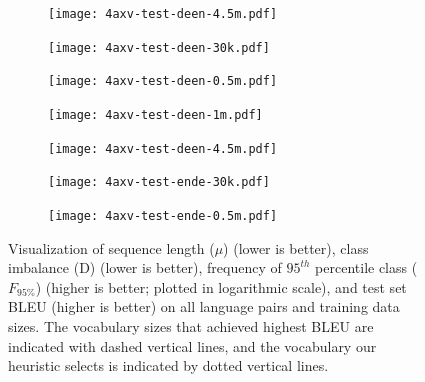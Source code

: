 \begin{figure}[h!t]
\centering
\begin{subfigure}{\textwidth}
  \centering
  \texttt{[image: 4axv-test-deen-4.5m.pdf]}
\end{subfigure}

\vspace{1mm}

\begin{subfigure}{.44\textwidth}
  \centering
  \texttt{[image: 4axv-test-deen-30k.pdf]}
\end{subfigure}
\begin{subfigure}{.44\textwidth}
  \centering
  \texttt{[image: 4axv-test-deen-0.5m.pdf]}
\end{subfigure}


\begin{subfigure}{.44\textwidth}
  \centering
  \texttt{[image: 4axv-test-deen-1m.pdf]}
\end{subfigure}
\begin{subfigure}{.44\textwidth}
  \centering
  \texttt{[image: 4axv-test-deen-4.5m.pdf]}
\end{subfigure}

\begin{subfigure}{.44\textwidth}
  \centering
  \texttt{[image: 4axv-test-ende-30k.pdf]}
\end{subfigure}
\begin{subfigure}{.44\textwidth}
  \centering
  \texttt{[image: 4axv-test-ende-0.5m.pdf]}
\end{subfigure}

\caption[Visualization of sequence length, class imbalance, frequency of $95^{th}$ percentile class, and test set BLEU.]{Visualization of sequence length ($\mu$) (lower is better), class imbalance (D) (lower is better), frequency of $95^{th}$ percentile class ($F_{95\%}$) (higher is better; plotted in logarithmic scale), and test set BLEU (higher is better) on all language pairs and training data sizes.
The vocabulary sizes that achieved highest BLEU are indicated with dashed vertical lines, and the vocabulary our heuristic selects is indicated by dotted vertical lines.}
\label{fig:mu-d-freq-bleu}
\end{figure}

